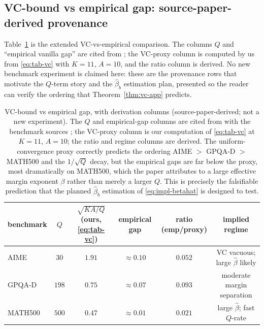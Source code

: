 \documentclass{article} %
\begin{document}
\subsection{VC-bound vs empirical gap: source-paper-derived provenance}
\label{app:tab-vc-provenance}

Table~\ref{tab:full-vc} is the extended VC-vs-empirical comparison. The columns
$Q$ and ``empirical vanilla gap'' are cited from \cite{komiyama2026best}; the
VC-proxy column is computed by us from \eqref{eq:tab-vc} with $K=11$, $A=10$,
and the ratio column is derived. No new benchmark experiment is claimed here:
these are the provenance rows that motivate the $Q$-term story and the
$\widehat\beta_b$ estimation plan, presented so the reader can verify the
ordering that Theorem~\ref{thm:vc-app} predicts.

\begin{table}[t]
\centering
\small
\begin{tabular}{lccccc}
\toprule
benchmark & $Q$ & $\sqrt{KA/Q}$ (ours, \eqref{eq:tab-vc}) & empirical gap \cite{komiyama2026best} & ratio (emp/proxy) & implied regime \\
\midrule
AIME    & $30$  & $1.91$ & $\approx 0.10$ & $0.052$ & VC vacuous; large $\widehat\beta$ likely \\
GPQA-D \cite{rein2023gpqaag}  & $198$ & $0.75$ & $\approx 0.07$ & $0.093$ & moderate margin separation \\
MATH500 \cite{hendrycks2021measuringmp} & $500$ & $0.47$ & $\approx 0.01$ & $0.021$ & large $\widehat\beta$; fast $Q$-rate \\
\bottomrule
\end{tabular}
\caption{VC-bound vs empirical gap, with derivation columns
(source-paper-derived; not a new experiment). The $Q$ and empirical-gap columns
are cited from \cite{komiyama2026best} with the benchmark sources
\cite{rein2023gpqaag,hendrycks2021measuringmp}; the VC-proxy column is our
computation of \eqref{eq:tab-vc} at $K=11$, $A=10$; the ratio and regime columns
are derived. The uniform-convergence proxy correctly predicts the ordering
AIME $>$ GPQA-D $>$ MATH500 and the $1/\sqrt Q$ decay, but the empirical gaps are
far below the proxy, most dramatically on MATH500, which the paper
attributes to a large effective margin exponent $\beta$ rather than merely a
larger $Q$. This is precisely the falsifiable prediction that the planned
$\widehat\beta_b$ estimation of \eqref{eq:impl-betahat} is designed to test.}
\label{tab:full-vc}
\end{table}
\end{document}
